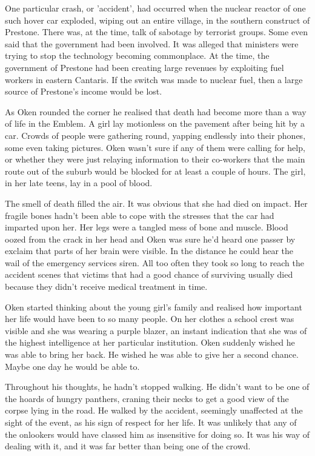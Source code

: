 One particular crash, or 'accident', had occurred when the nuclear reactor of one such hover car exploded, wiping out an entire village, in the southern construct of Prestone.  There was, at the time, talk of sabotage by terrorist groups.  Some even said that the government had been involved.  It was alleged that ministers were trying to stop the technology becoming commonplace.  At the time, the government of Prestone had been creating large revenues by exploiting fuel workers in eastern Cantaris.  If the switch was made to nuclear fuel, then a large source of Prestone's income would be lost.  

As Oken rounded the corner he realised that death had become more than a way of life in the Emblem.  A girl lay motionless on the pavement after being hit by a car.  Crowds of people were gathering round, yapping endlessly into their phones, some even taking pictures.  Oken wasn't sure if any of them were calling for help, or whether they were just relaying information to their co-workers that the main route out of the suburb would be blocked for at least a couple of hours.  The girl, in her late teens, lay in a pool of blood.  

The smell of death filled the air.  It was obvious that she had died on impact.  Her fragile bones hadn't been able to cope with the stresses that the car had imparted upon her.  Her legs were a tangled mess of bone and muscle.  Blood oozed from the crack in her head and Oken was sure he'd heard one passer by exclaim that parts of her brain were visible.  In the distance he could hear the wail of the emergency services siren.  All too often they took so long to reach the accident scenes that victims that had a good chance of surviving usually died because they didn't receive medical treatment in time.  

Oken started thinking about the young girl's family and realised how important her life would have been to so many people.  On her clothes a school crest was visible and she was wearing a purple blazer, an instant indication that she was of the highest intelligence at her particular institution.  Oken suddenly wished he was able to bring her back.  He wished he was able to give her a second chance.  Maybe one day he would be able to.  

Throughout his thoughts, he hadn't stopped walking.  He didn't want to be one of the hoards of hungry panthers, craning their necks to get a good view of the corpse lying in the road.  He walked by the accident, seemingly unaffected at the sight of the event, as his sign of respect for her life.  It was unlikely that any of the onlookers would have classed him as insensitive for doing so.  It was his way of dealing with it, and it was far better than being one of the crowd.

